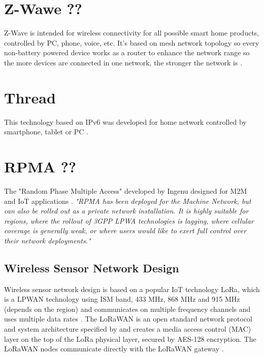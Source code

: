 \section{Z-Wawe ??}
Z-Wave is intended for wireless connectivity for all possible smart home products, controlled by PC, phone, voice, etc. It's based on mesh network topology so every non-battery powered device works as a router to enhance the network range so the more devices are connected in one network, the stronger the network is \cite{27} \cite{28}.


\section{Thread}
This technology based on IPv6 was developed for home network controlled by smartphone, tablet or PC \cite{29} \cite{30} \cite{31}.


\section{RPMA ??}
The "Random Phase Multiple Access" developed by Ingenu designed for M2M and IoT applications \cite{32} \cite{rpma_ublox} \cite{34}. \textit{"RPMA has been deployed for the Machine Network, but can also be rolled out as a private network installation. It is highly suitable for regions, where the rollout of 3GPP LPWA technologies is lagging, where cellular coverage is generally weak, or where users would like to exert full control over their network deployments."}\cite{rpma_ublox}






\subsection{Wireless Sensor Network Design}
Wireless sensor network design is based on a popular IoT technology LoRa, which is a LPWAN technology using ISM band, 433 MHz, 868 MHz and 915 MHz (depends on the region) and communicates on multiple frequency channels and uses multiple data rates \cite{LoRaWAN Evaluation for IoT Communications}.
The LoRaWAN is an open standard network protocol and system architecture specified by \cite{LoRaWAN specification} and creates a media access control (MAC) layer on the top of the LoRa physical layer, secured by AES-128 encryption.
The LoRaWAN nodes communicate directly with the LoRaWAN gateway \cite{Internet of Things (IoT) using LoRa technology}.


